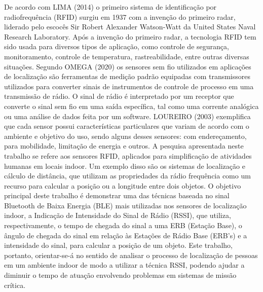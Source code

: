 \documentclass[
	article,			%
	12pt,				%
	oneside,			%
	a4paper,			%
	english,			%
	brazil,				%
	sumario=tradicional
	]{abntex2}
\begin{document}
De acordo com LIMA (2014) o primeiro sistema de identificação por radiofrequência (RFID) surgiu em 1937 com a invenção do primeiro radar, liderado pelo escocês Sir Robert Alexander Watson-Watt da United States Naval Research Laboratory.
Após a invenção do primeiro radar, a tecnologia RFID tem sido usada para diversos tipos de aplicação, como controle de segurança, monitoramento, controle de temperatura, rastreabilidade, entre outras diversas situações.
Segundo OMEGA (2020) os sensores sem fio utilizados em aplicações de localização são ferramentas de medição padrão equipadas com transmissores utilizados para converter sinais de instrumentos de controle de processo em uma transmissão de rádio. O sinal de rádio é interpretado por um receptor que converte o sinal sem fio em uma saída específica, tal como uma corrente analógica ou uma análise de dados feita por um software.  
LOUREIRO (2003) exemplifica que cada sensor possui características particulares que variam de acordo com o ambiente e objetivo do uso, sendo alguns desses sensores: com endereçamento, para mobilidade, limitação de energia e outros.
A pesquisa apresentada neste trabalho se refere aos sensores RFID, aplicados para simplificação de atividades humanas em locais indoor. Um exemplo disso são os sistemas de localização e cálculo de distância, que utilizam as propriedades da rádio frequência como um recurso para calcular a posição ou a longitude entre dois objetos.
O objetivo principal deste trabalho é demonstrar uma das técnicas baseada no sinal Bluetooth de Baixa Energia (BLE) mais utilizadas nos sensores de localização indoor, a Indicação de Intensidade do Sinal de Rádio (RSSI), que utiliza, respectivamente, o tempo de chegada do sinal a uma ERB (Estação Base), o ângulo de chegada do sinal em relação às Estações de Rádio Base (ERB’s) e a intensidade do sinal, para calcular a posição de um objeto.  
Este trabalho, portanto, orientar-se-á no sentido de analisar o processo de localização de pessoas em um ambiente indoor de modo a utilizar a técnica RSSI, podendo ajudar a diminuir o tempo de atuação envolvendo problemas em sistemas de missão crítica.
\end{document}

